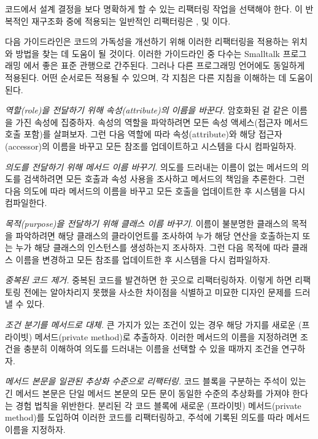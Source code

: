 \documentclass[a4paper,10pt,twoside]{book}
\begin{document}
코드에서 설계 결정을 보다 명확하게 할 수 있는 리팩터링 작업을 선택해야 한다. 이 반복적인 재구조화 중에 적용되는 일반적인 리팩터링은 ,  및 이다.

다음 가이드라인은 코드의 가독성을 개선하기 위해 이러한 리팩터링을 적용하는 위치와 방법을 찾는 데 도움이 될 것이다. 이러한 가이드라인 중 다수는 Smalltalk 프로그래밍 \cite{Beck97a}에서 좋은 표준 관행으로 간주된다. 그러나 다른 프로그래밍 언어에도 동일하게 적용된다. 어떤 순서로든 적용될 수 있으며, 각 지침은 다른 지침을 이해하는 데 도움이 된다.

\begin{bulletlist}
\item \emph{역할(role)을 전달하기 위해 속성(attribute)의 이름을 바꾼다.}
암호화된 겉 같은 이름을 가진 속성에 집중하자. 속성의 역할을 파악하려면 모든 속성 액세스(접근자 메서드 호출 포함)를 살펴보자. 그런 다음 역할에 따라 속성(attribute)와 해당 접근자(accessor)의 이름을 바꾸고 모든 참조를 업데이트하고 시스템을 다시 컴파일하자.

\item \emph{의도를 전달하기 위해 메서드 이름 바꾸기.}
의도를 드러내는 이름이 없는 메서드의 의도를 검색하려면 모든 호출과 속성 사용을 조사하고 메서드의 책임을 추론한다. 그런 다음 의도에 따라 메서드의 이름을 바꾸고 모든 호출을 업데이트한 후 시스템을 다시 컴파일한다.

\item \emph{목적(purpose)을 전달하기 위해 클래스 이름 바꾸기.}
이름이 불분명한 클래스의 목적을 파악하려면 해당 클래스의 클라이언트를 조사하여 누가 해당 연산을 호출하는지 또는 누가 해당 클래스의 인스턴스를 생성하는지 조사하자. 그런 다음 목적에 따라 클래스 이름을 변경하고 모든 참조를 업데이트한 후 시스템을 다시 컴파일하자.

\item \emph{중복된 코드 제거.}
중복된 코드를 발견하면 한 곳으로 리팩터링하자. 이렇게 하면 리팩토링 전에는 알아차리지 못했을 사소한 차이점을 식별하고 미묘한 디자인 문제를 드러낼 수 있다. 

\item \emph{조건 분기를 메서드로 대체.}
큰 가지가 있는 조건이 있는 경우 해당 가지를 새로운 (프라이빗) 메서드(private method)로 추출하자. 이러한 메서드의 이름을 지정하려면 조건을 충분히 이해하여 의도를 드러내는 이름을 선택할 수 있을 때까지 조건을 연구하자.

\item \emph{메서드 본문을 일관된 추상화 수준으로 리팩터링.}
코드 블록을 구분하는 주석이 있는 긴 메서드 본문은 단일 메서드 본문의 모든 문이 동일한 수준의 추상화를 가져야 한다는 경험 법칙을 위반한다. 분리된 각 코드 블록에 새로운 (프라이빗) 메서드(private method)를 도입하여 이러한 코드를 리팩터링하고, 주석에 기록된 의도를 따라 메서드 이름을 지정하자.
\end{bulletlist}
\end{document}
